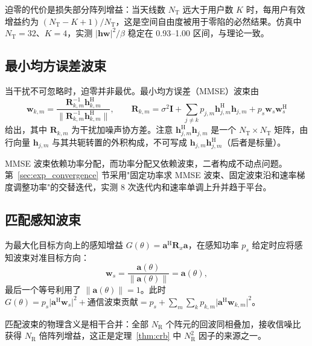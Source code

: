 迫零的代价是损失部分阵列增益：当天线数 $N_{\mathrm{T}}$ 远大于用户数 $K$ 时，每用户有效增益约为 $(N_{\mathrm{T}}-K+1)/N_{\mathrm{T}}$，这是空间自由度被用于零陷的必然结果。仿真中 $N_{\mathrm{T}}=32$、$K=4$，实测 $\lvert\mathbf{h}\mathbf{w}\rvert^{2}/\beta$ 稳定在 0.93–1.00 区间，与理论一致。

\subsection{最小均方误差波束}
\label{sec:mmse}

当干扰不可忽略时，迫零并非最优。最小均方误差（MMSE）波束由
\begin{equation}
  \mathbf{w}_{k,m}=\frac{\mathbf{R}_{k,m}^{-1}\mathbf{h}_{k,m}^{\mathrm{H}}}
  {\lVert\mathbf{R}_{k,m}^{-1}\mathbf{h}_{k,m}^{\mathrm{H}}\rVert},
  \qquad
  \mathbf{R}_{k,m}=\sigma^{2}\mathbf{I}+\sum_{j\ne k}p_{j,m}\mathbf{h}_{j,m}^{\mathrm{H}}\mathbf{h}_{j,m}+p_{s}\mathbf{w}_{s}\mathbf{w}_{s}^{\mathrm{H}}
  \label{eq:mmse}
\end{equation}
给出，其中 $\mathbf{R}_{k,m}$ 为干扰加噪声协方差。注意 $\mathbf{h}_{j,m}^{\mathrm{H}}\mathbf{h}_{j,m}$ 是一个 $N_{\mathrm{T}}\times N_{\mathrm{T}}$ 矩阵，由行向量 $\mathbf{h}_{j,m}$ 与其共轭转置的外积构成，不可写成 $\mathbf{h}_{j,m}\mathbf{h}_{j,m}^{\mathrm{H}}$（后者是标量）。

MMSE 波束依赖功率分配，而功率分配又依赖波束，二者构成不动点问题。第~\ref{sec:exp_convergence} 节采用"固定功率求 MMSE 波束、固定波束沿和速率梯度调整功率"的交替迭代，实测 8 次迭代内和速率单调上升并趋于平台。

\subsection{匹配感知波束}
\label{sec:matched_beam}

为最大化目标方向上的感知增益 $G(\theta)=\mathbf{a}^{\mathrm{H}}\mathbf{R}_{x}\mathbf{a}$，在感知功率 $p_{s}$ 给定时应将感知波束对准目标方向：
\begin{equation}
  \mathbf{w}_{s}=\frac{\mathbf{a}(\theta)}{\lVert\mathbf{a}(\theta)\rVert}=\mathbf{a}(\theta),
  \label{eq:matched}
\end{equation}
最后一个等号利用了 $\lVert\mathbf{a}(\theta)\rVert=1$。此时 $G(\theta)=p_{s}\lvert\mathbf{a}^{\mathrm{H}}\mathbf{w}_{s}\rvert^{2}+\text{通信波束贡献}=p_{s}+\sum_{m}\sum_{k}p_{k,m}\lvert\mathbf{a}^{\mathrm{H}}\mathbf{w}_{k,m}\rvert^{2}$。

匹配波束的物理含义是相干合并：全部 $N_{\mathrm{R}}$ 个阵元的回波同相叠加，接收信噪比获得 $N_{\mathrm{R}}$ 倍阵列增益，这正是定理~\ref{thm:crb} 中 $N_{\mathrm{R}}^{2}$ 因子的来源之一。

